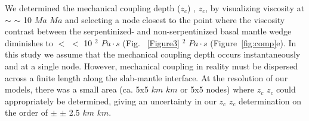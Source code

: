 \documentclass[draft,linenumbers]{agujournal2018} %
\providecommand{\DIFaddtex}[1]{{\protect\color{blue} \sf #1}} %
\providecommand{\DIFdeltex}[1]{{\protect\color{red} \scriptsize #1}} %
\providecommand{\DIFaddbegin}{} %
\providecommand{\DIFaddend}{} %
\providecommand{\DIFdelbegin}{} %
\providecommand{\DIFdelend}{} %
\providecommand{\DIFadd}[1]{\texorpdfstring{\DIFaddtex{#1}}{#1}} %
\providecommand{\DIFdel}[1]{\texorpdfstring{\DIFdeltex{#1}}{}} %
\newcommand{\DIFscaledelfig}{0.3}
\newlength{\DIFdelgraphicswidth} %
\newlength{\DIFdelgraphicsheight} %
\newcommand{\DIFaddincludegraphics}[2][]{{\color{blue}\fbox{\DIFOincludegraphics[#1]{#2}}}} %
\newcommand{\DIFdelincludegraphics}[2][]{%
\sbox{\DIFdelgraphicsbox}{\DIFOincludegraphics[#1]{#2}}%
\settoboxwidth{\DIFdelgraphicswidth}{\DIFdelgraphicsbox} %
\settoboxtotalheight{\DIFdelgraphicsheight}{\DIFdelgraphicsbox} %
\scalebox{\DIFscaledelfig}{%
\parbox[b]{\DIFdelgraphicswidth}{\usebox{\DIFdelgraphicsbox}\\[-\baselineskip] \rule{\DIFdelgraphicswidth}{0em}}\llap{\resizebox{\DIFdelgraphicswidth}{\DIFdelgraphicsheight}{%
\setlength{\unitlength}{\DIFdelgraphicswidth}%
\begin{picture}(1,1)%
\thicklines\linethickness{2pt} %
{\color[rgb]{1,0,0}\put(0,0){\framebox(1,1){}}}%
{\color[rgb]{1,0,0}\put(0,0){\line( 1,1){1}}}%
{\color[rgb]{1,0,0}\put(0,1){\line(1,-1){1}}}%
\end{picture}%
}\hspace*{3pt}}} %
} %
\DeclareRobustCommand{\DIFaddbegin}{\DIFOaddbegin \let\includegraphics\DIFaddincludegraphics} %
\DeclareRobustCommand{\DIFaddend}{\DIFOaddend \let\includegraphics\DIFOincludegraphics} %
\DeclareRobustCommand{\DIFdelbegin}{\DIFOdelbegin \let\includegraphics\DIFdelincludegraphics} %
\DeclareRobustCommand{\DIFdelend}{\DIFOaddend \let\includegraphics\DIFOincludegraphics} %
\begin{document}
\DIFdelend We determined the mechanical coupling depth\DIFdelbegin \DIFdel{($z_c$) }\DIFdelend \DIFaddbegin \DIFadd{, \(z_{c}\), }\DIFaddend by visualizing
viscosity at \DIFdelbegin \DIFdel{$\sim$}\DIFdelend \DIFaddbegin \DIFadd{\(\sim\) }\DIFaddend 10 \DIFdelbegin \DIFdel{$Ma$ }\DIFdelend \DIFaddbegin \DIFadd{\(Ma\) }\DIFaddend and selecting a node closest to the
point where the viscosity contrast between the serpentinized- and
non-serpentinized basal mantle wedge diminishes to \DIFdelbegin \DIFdel{$<$ }\DIFdelend \DIFaddbegin \DIFadd{\(<\) }\DIFaddend 10\DIFdelbegin \DIFdel{$^2$ $Pa\cdot s$ (Fig.~}%
\DIFdel{\ref{Figure3}}\DIFdelend \DIFaddbegin \DIFadd{\(^{2}\)
\(Pa \cdot s\) (Figure~\ref{fig:comp}}\DIFaddend e). In this study we assume that
the mechanical coupling depth occurs instantaneously and at a single
node. However, mechanical coupling in reality must be dispersed across a
finite length along the slab-mantle interface. At the resolution of our
models, there was a small area (ca. 5x5 \DIFdelbegin \DIFdel{$km$ }\DIFdelend \DIFaddbegin \DIFadd{\(km\) }\DIFaddend or 5x5 nodes) where
\DIFdelbegin \DIFdel{$z_c$ }\DIFdelend \DIFaddbegin \DIFadd{\(z_{c}\) }\DIFaddend could appropriately be determined, giving an uncertainty in
our \DIFdelbegin \DIFdel{$z_c$ }\DIFdelend \DIFaddbegin \DIFadd{\(z_{c}\) }\DIFaddend determination on the order of \DIFdelbegin \DIFdel{$\pm$ }\DIFdelend \DIFaddbegin \DIFadd{\(\pm\) }\DIFaddend 2.5 \DIFdelbegin \DIFdel{$km$}\DIFdelend \DIFaddbegin \DIFadd{\(km\)}\DIFaddend .
\end{document}
